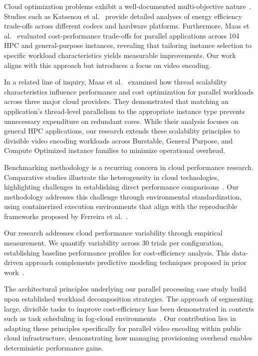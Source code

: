 \documentclass[conference]{IEEEtran}
\begin{document}
Cloud optimization problems exhibit a well-documented multi-objective
nature~\cite{b8,b14,b1}. Studies such as Katsenou et al.~\cite{b8}
provide detailed analyses of energy efficiency trade-offs across different
codecs and hardware platforms. Furthermore, Maas et al.~\cite{b1}
evaluated cost-performance trade-offs for parallel applications across 104 HPC
and general-purpose instances, revealing that tailoring instance selection to
specific workload characteristics yields measurable improvements. Our work
aligns with this approach but introduces a focus on video encoding.

In a related line of inquiry, Maas et al.~\cite{b23} examined how
thread scalability characteristics influence performance and cost optimization
for parallel workloads across three major cloud providers. They demonstrated
that matching an application's thread-level parallelism to the appropriate
instance type prevents unnecessary expenditure on redundant cores. While their
analysis focuses on general HPC applications, our research extends these
scalability principles to divisible video encoding workloads across Burstable,
General Purpose, and Compute Optimized instance families to minimize
operational overhead.

Benchmarking methodology is a recurring concern in cloud performance
research. Comparative studies illustrate the heterogeneity in cloud
technologies, highlighting challenges in establishing direct performance
comparisons~\cite{b18, b1}. Our methodology addresses this challenge through
environmental standardization, using containerized execution environments that
align with the reproducible frameworks proposed by Ferreira et al.~\cite{b9}.

Our research addresses cloud performance variability through empirical
measurement. We quantify variability across 30 trials per configuration,
establishing baseline performance profiles for cost-efficiency analysis. This
data-driven approach complements predictive modeling techniques proposed in
prior work~\cite{b10, b11}.

The architectural principles underlying our parallel processing case study
build upon established workload decomposition strategies. The approach of
segmenting large, divisible tasks to improve cost-efficiency has been
demonstrated in contexts such as task scheduling in fog-cloud
environments~\cite{b12, b13}. Our contribution lies in adapting these
principles specifically for parallel video encoding within public cloud
infrastructure, demonstrating how managing provisioning overhead enables
deterministic performance gains.
\end{document}
